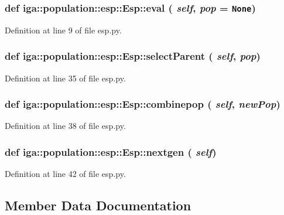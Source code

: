 \subsubsection{\setlength{\rightskip}{0pt plus 5cm}def iga::population::esp::Esp::eval ( {\em self},  {\em pop} = {\tt None})}\label{classiga_1_1population_1_1esp_1_1Esp_3dd0c61ea305ca8e63777cb87878df06}




Definition at line 9 of file esp.py.
\subsubsection{\setlength{\rightskip}{0pt plus 5cm}def iga::population::esp::Esp::selectParent ( {\em self},  {\em pop})}\label{classiga_1_1population_1_1esp_1_1Esp_6b85009062ecac163eb03087df1a0df9}




Definition at line 35 of file esp.py.
\subsubsection{\setlength{\rightskip}{0pt plus 5cm}def iga::population::esp::Esp::combinepop ( {\em self},  {\em newPop})}\label{classiga_1_1population_1_1esp_1_1Esp_0b8af2a00e5c0d271a2f211ebf0247d7}




Definition at line 38 of file esp.py.
\subsubsection{\setlength{\rightskip}{0pt plus 5cm}def iga::population::esp::Esp::nextgen ( {\em self})}\label{classiga_1_1population_1_1esp_1_1Esp_3c556187374c63d7d576d67550765348}




Definition at line 42 of file esp.py.

\subsection{Member Data Documentation}

